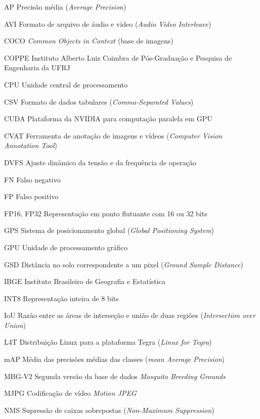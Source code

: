 \begin{siglas}
    \setlength{\itemsep}{2pt}
    \item[AP]    Precisão média (\textit{Average Precision})
    \item[AVI] Formato de arquivo de áudio e vídeo (\textit{Audio Video Interleave})
    \item[COCO]  \textit{Common Objects in Context} (base de imagens)
    \item[COPPE] Instituto Alberto Luiz Coimbra de Pós-Graduação e Pesquisa de Engenharia da UFRJ
    \item[CPU]   Unidade central de processamento
    \item[CSV] Formato de dados tabulares (\textit{Comma-Separated Values})
    \item[CUDA]  Plataforma da NVIDIA para computação paralela em GPU
    \item[CVAT] Ferramenta de anotação de imagens e vídeos (\textit{Computer Vision Annotation Tool})
    \item[DVFS]  Ajuste dinâmico da tensão e da frequência de operação
    \item[FN]    Falso negativo
    \item[FP]    Falso positivo
    \item[FP16, FP32] Representação em ponto flutuante com 16 ou 32 bits
    \item[GPS]   Sistema de posicionamento global (\textit{Global Positioning System})
    \item[GPU]   Unidade de processamento gráfico
    \item[GSD]   Distância no solo correspondente a um pixel (\textit{Ground Sample Distance})
    \item[IBGE] Instituto Brasileiro de Geografia e Estatística
    \item[INT8]  Representação inteira de 8 bits
    \item[IoU]   Razão entre as áreas de interseção e união de duas regiões (\textit{Intersection over Union})
    \item[L4T] Distribuição Linux para a plataforma Tegra (\textit{Linux for Tegra})
    \item[mAP]   Média das precisões médias das classes (\textit{mean Average Precision})
    \item[MBG-V2] Segunda versão da base de dados \textit{Mosquito Breeding Grounds}
    \item[MJPG] Codificação de vídeo \textit{Motion JPEG}
    \item[NMS]   Supressão de caixas sobrepostas (\textit{Non-Maximum Suppression})

\end{siglas}
